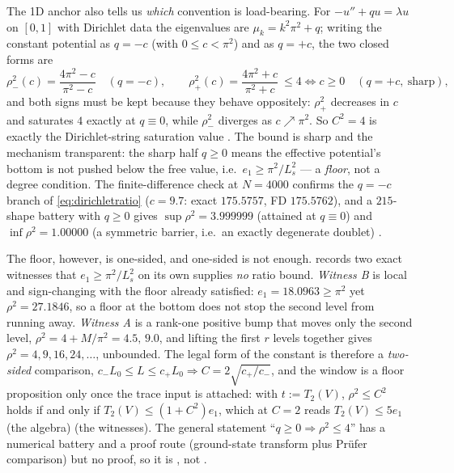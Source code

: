 The 1D anchor also tells us \emph{which} convention is load-bearing. For $-u''+qu=\lambda u$ on
$[0,1]$ with Dirichlet data the eigenvalues are $\mu_k=k^2\pi^2+q$; writing the constant potential as
$q=-c$ (with $0\le c<\pi^2$) and as $q=+c$, the two closed forms are
\begin{equation}
  \rho^2_{-}(c)=\frac{4\pi^2-c}{\pi^2-c}\quad(q=-c),
  \qquad
  \rho^2_{+}(c)=\frac{4\pi^2+c}{\pi^2+c}\ \le 4\iff c\ge0\quad(q=+c,\ \text{sharp}) ,
  \label{eq:dirichletratio}
\end{equation}
and both signs must be kept because they behave oppositely: $\rho^2_{+}$ decreases in $c$ and
saturates $4$ exactly at $q\equiv0$, while $\rho^2_{-}$ diverges as $c\nearrow\pi^2$. So $C^2=4$ is
exactly the Dirichlet-string saturation value \LT. The bound is sharp and the
mechanism transparent: the sharp half $q\ge0$ means the effective potential's bottom is not pushed
below the free value, i.e.\ $e_1\ge\pi^2/L_s^2$ --- a \emph{floor}, not a degree condition. The
finite-difference check at $N=4000$ confirms the $q=-c$ branch of \eqref{eq:dirichletratio} ($c=9.7$:
exact $175.5757$, FD $175.5762$), and a $215$-shape battery with $q\ge0$ gives $\sup\rho^2=3.999999$
(attained at $q\equiv0$) and $\inf\rho^2=1.00000$ (a symmetric barrier, i.e.\ an exactly degenerate
doublet) \LE.

The floor, however, is one-sided, and one-sided is not enough. 
records two exact witnesses that $e_1\ge\pi^2/L_s^2$ on its own supplies \emph{no} ratio bound.
\emph{Witness B} is local and sign-changing with the floor already satisfied:
$e_1=18.0963\ge\pi^2$ yet $\rho^2=27.1846$, so a floor at the bottom does not stop the second level
from running away. \emph{Witness A} is a rank-one positive bump that moves only the second level,
$\rho^2=4+M/\pi^2=4.5,\,9.0$, and lifting the first $r$ levels together gives
$\rho^2=4,9,16,24,\dots$, unbounded. The legal form of the constant is therefore a \emph{two-sided}
comparison, $c_-L_0\le L\le c_+L_0\Rightarrow C=2\sqrt{c_+/c_-}$, and the window is a floor
proposition only once the trace input is attached: with $t:=T_2(V)$, $\rho^2\le C^2$ holds if and
only if $T_2(V)\le(1+C^2)e_1$, which at $C=2$ reads $T_2(V)\le5e_1$ \LT{} (the algebra) \LE{} (the
witnesses). The general
statement ``$q\ge0\Rightarrow\rho^2\le4$'' has a numerical battery and a proof route
(ground-state transform plus Pr\"ufer comparison) but no proof, so it is \LC, not \LT.

